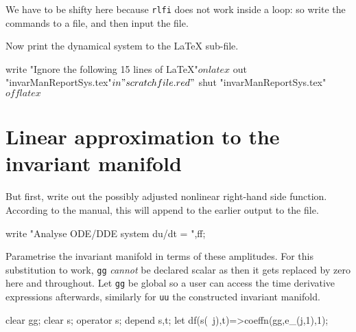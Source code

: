 \documentclass[11pt,a5paper]{article}
\begin{document}
We have to be shifty here because \verb|rlfi| does not work
inside a loop: so write the commands to a file, and then
input the file.

Now print the dynamical system to the LaTeX sub-file.
\begin{reduce}
write "Ignore the following 15 lines of LaTeX"$
on latex$
out "invarManReportSys.tex"$
in "scratchfile.red"$
shut "invarManReportSys.tex"$
off latex$
\end{reduce}







\section{Linear approximation to the invariant manifold}

But first, write out the possibly adjusted nonlinear
right-hand side function. According to the manual, this will
append to the earlier output to the file.
\begin{reduce}
write "Analyse ODE/DDE system du/dt = ",ff;
\end{reduce}

Parametrise the invariant manifold in terms of these
amplitudes. For this substitution to work, \verb|gg|
\emph{cannot} be declared scalar as then it gets replaced by
zero here and throughout.  Let \verb|gg| be global so a user
can access the time derivative expressions afterwards,
similarly for \verb|uu| the constructed invariant manifold.
\begin{reduce}
clear gg;
clear s; operator s; depend s,t;
let df(s(~j),t)=>coeffn(gg,e_(j,1),1);
\end{reduce}
\end{document}
